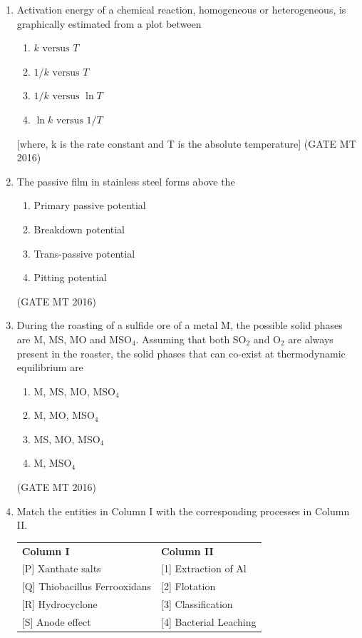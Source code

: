 \documentclass[11pt, letterpaper]{article}
\theoremstyle{remark}
\begin{document}
\begin{enumerate}
\item Activation energy of a chemical reaction, homogeneous or heterogeneous, is graphically estimated from a plot between
\begin{enumerate}
\item $k \text{ versus } T$
\item $1/k \text{ versus } T$
\item $1/k \text{ versus } \ln T$
\item $\ln k \text{ versus } 1/T$
\end{enumerate}
[where, k is the rate constant and T is the absolute temperature]
\hfill(GATE MT 2016)

\item The passive film in stainless steel forms above the
\begin{enumerate}
\item Primary passive potential
\item Breakdown potential
\item Trans-passive potential
\item Pitting potential
\end{enumerate}
\hfill(GATE MT 2016)

\item During the roasting of a sulfide ore of a metal M, the possible solid phases are M, MS, MO and MSO$_4$. Assuming that both SO$_2$ and O$_2$ are always present in the roaster, the solid phases that can co-exist at thermodynamic equilibrium are
\begin{multicols}{2}
\begin{enumerate}
\item M, MS, MO, MSO$_4$
\item M, MO, MSO$_4$
\item MS, MO, MSO$_4$
\item M, MSO$_4$
\end{enumerate}  
\end{multicols}
\hfill(GATE MT 2016)


\item Match the entities in Column I with the corresponding processes in Column II.  

\begin{tabular}{ll}
\textbf{Column I} & \textbf{Column II} \\
{[P]} Xanthate salts & {[1]} Extraction of Al \\
{[Q]} Thiobacillus Ferrooxidans & {[2]} Flotation \\
{[R]} Hydrocyclone & {[3]} Classification \\
{[S]} Anode effect & {[4]} Bacterial Leaching \\
\end{tabular}


\end{enumerate}
\end{document}
